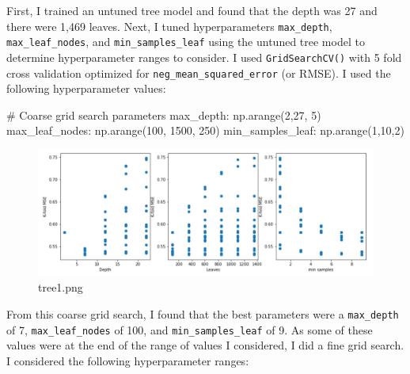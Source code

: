 \documentclass[
  letterpaper,
  DIV=11,
  numbers=noendperiod]{scrartcl}
\newenvironment{Shaded}{\begin{snugshade}}{\end{snugshade}}
\newcommand{\CommentTok}[1]{\textcolor[rgb]{0.37,0.37,0.37}{#1}}
\newcommand{\DecValTok}[1]{\textcolor[rgb]{0.68,0.00,0.00}{#1}}
\newcommand{\NormalTok}[1]{\textcolor[rgb]{0.00,0.23,0.31}{#1}}
\begin{document}
First, I trained an untuned tree model and found that the depth was 27
and there were 1,469 leaves. Next, I tuned hyperparameters
\texttt{max\_depth}, \texttt{max\_leaf\_nodes}, and
\texttt{min\_samples\_leaf} using the untuned tree model to determine
hyperparameter ranges to consider. I used \texttt{GridSearchCV()} with 5
fold cross validation optimized for \texttt{neg\_mean\_squared\_error}
(or RMSE). I used the following hyperparameter values:

\begin{Shaded}
\begin{Highlighting}[]
\CommentTok{\# Coarse grid search parameters}
\CommentTok{\textquotesingle{}max\_depth\textquotesingle{}}\NormalTok{: np.arange(}\DecValTok{2}\NormalTok{,}\DecValTok{27}\NormalTok{, }\DecValTok{5}\NormalTok{)}
\CommentTok{\textquotesingle{}max\_leaf\_nodes\textquotesingle{}}\NormalTok{: np.arange(}\DecValTok{100}\NormalTok{, }\DecValTok{1500}\NormalTok{, }\DecValTok{250}\NormalTok{)}
\CommentTok{\textquotesingle{}min\_samples\_leaf\textquotesingle{}}\NormalTok{: np.arange(}\DecValTok{1}\NormalTok{,}\DecValTok{10}\NormalTok{,}\DecValTok{2}\NormalTok{)}
\end{Highlighting}
\end{Shaded}

\begin{figure}

{\centering \includegraphics{Project_Report_Saturn_files/figure-pdf/tree1.png}

}

\caption{tree1.png}

\end{figure}

From this coarse grid search, I found that the best parameters were a
\texttt{max\_depth} of 7, \texttt{max\_leaf\_nodes} of 100, and
\texttt{min\_samples\_leaf} of 9. As some of these values were at the
end of the range of values I considered, I did a fine grid search. I
considered the following hyperparameter ranges:
\end{document}
